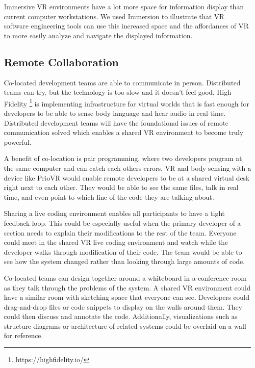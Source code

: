 \documentclass[conference]{IEEEtran}
\begin{document}
Immersive VR environments have a lot more space for information display than current computer workstations.
We used Immersion to illustrate that VR software engineering tools can use this increased space and the affordances of VR to more easily analyze and navigate the displayed information.

\subsection{Remote Collaboration}


Co-located development teams are able to communicate in person. 
Distributed teams can try, but the technology is too slow and it doesn't feel good. 
High Fidelity \footnote{https://highfidelity.io/} is implementing infrastructure for virtual worlds that is fast enough for developers to be able to sense body language and hear audio in real time.  
Distributed development teams will have the foundational issues of remote communication solved which enables a shared VR environment to become truly powerful.

A benefit of co-location is pair programming, where two developers program at the same computer and can catch each others errors. 
VR and body sensing with a device like PrioVR would enable remote developers to be at a shared virtual desk right next to each other. 
They would be able to see the same files, talk in real time, and even point to which line of the code they are talking about. 

Sharing a live coding environment enables all participants to have a tight feedback loop. 
This could be especially useful when the primary developer of a section needs to explain their modifications to the rest of the team. 
Everyone could meet in the shared VR live coding environment and watch while the developer walks through modification of their code. 
The team would be able to see how the system changed rather than looking through large amounts of code.

Co-located teams can design together around a whiteboard in a conference room as they talk through the problems of the system. 
A shared VR environment could have a similar room with sketching space that everyone can see. 
Developers could drag-and-drop files or code snippets to display on the walls around them. 
They could then discuss and annotate the code. 
Additionally, visualizations such as structure diagrams or architecture of related systems could be overlaid on a wall for reference.
\end{document}
